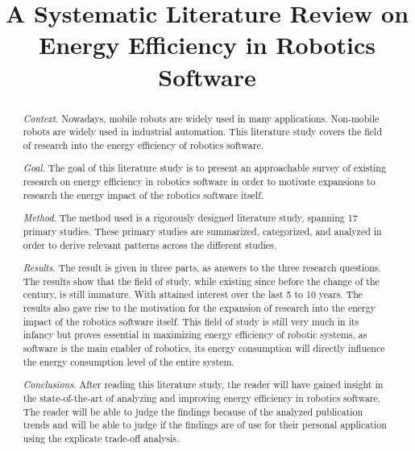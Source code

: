 \documentclass[10pt, conference, compsocconf]{IEEEtran}
\begin{document}
\title{
	{A Systematic Literature Review on Energy Efficiency in Robotics Software}
}

\author{

\vspace{5mm}

}


\maketitle

\begin{abstract}
\noindent \textit{Context}. 
Nowadays, mobile robots are widely used in many applications. Non-mobile robots are widely used in industrial automation.
This literature study covers the field of research into the energy efficiency of robotics software.

\noindent \textit{Goal}. 
The goal of this literature study is to present an approachable survey of existing research on energy efficiency in robotics software
in order to motivate expansions to research the energy impact of the robotics software itself.

\noindent \textit{Method}. 
The method used is a rigorously designed literature study, spanning 17 primary studies. 
These primary studies are summarized, categorized, and analyzed in order to derive relevant patterns across the different studies.

\noindent \textit{Results}. 
The result is given in three parts, as answers to the three research questions. 
The results show that the field of study, while existing since before the change of the century, is still immature.
With attained interest over the last 5 to 10 years.
The results also gave rise to the motivation for the expansion of research into the energy impact of the robotics software itself.
This field of study is still very much in its infancy but proves essential in maximizing energy efficiency of robotic systems, 
as software is the main enabler of robotics, its energy consumption will directly inﬂuence the energy consumption level of the
entire system.

\noindent \textit{Conclusions}.
After reading this literature study, the reader will have gained insight in the state-of-the-art of analyzing and 
improving energy efficiency in robotics software. The reader will be able to judge the findings because of the analyzed publication trends
and will be able to judge if the findings are of use for their personal application using the explicate trade-off analysis.
\end{abstract}
\end{document}
